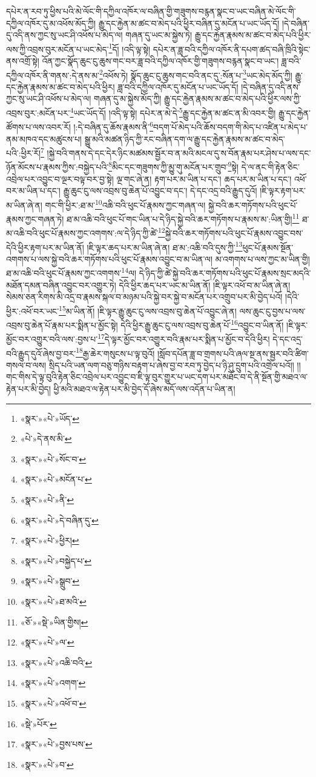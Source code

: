 དཔེར་ན་རབ་ཏུ་ཕྱིས་པའི་མེ་ལོང་གི་དཀྱིལ་འཁོར་ལ་བཞིན་གྱི་གཟུགས་བརྙན་སྣང་བ་ཡང་བཞིན་མེ་ལོང་གི་དཀྱིལ་འཁོར་དུ་མ་འཕོས་མོད་ཀྱི། རྒྱུ་དང་རྐྱེན་མ་ཚང་བ་མེད་པའི་ཕྱིར་བཞིན་དུ་མངོན་པ་ཡང་ཡོད་དོ། །དེ་བཞིན་དུ་འདི་ནས་ཀྱང་སུ་ཡང་ཤི་འཕོས་པ་མེད་ལ། གཞན་དུ་ཡང་མ་སྐྱེས་ཏེ། རྒྱུ་དང་རྐྱེན་རྣམས་མ་ཚང་བ་མེད་པའི་ཕྱིར་ལས་ཀྱི་འབྲས་བུར་མངོན་པ་ཡང་མེད་\footnote{«སྣར་»«པེ་»ཡོད་}དོ། །འདི་ལྟ་སྟེ། དཔེར་ན་ཟླ་བའི་དཀྱིལ་འཁོར་ནི་དཔག་ཚད་བཞི་ཁྲིའི་སྟེང་ནས་འགྲོ་སྟེ། འོན་ཀྱང་སྣོད་ཆུང་ངུ་ཆུས་གང་བར་ཟླ་བའི་དཀྱིལ་འཁོར་གྱི་གཟུགས་བརྙན་སྣང་བ་ཡང་། ཟླ་བའི་དཀྱིལ་འཁོར་ནི་གནས་:དེ་ནས་མ་\footnote{«པེ་»དེ་ནས་མི་}འཕོས་ཏེ། སྣོད་ཆུང་ངུ་ཆུས་གང་བའི་ནང་དུ་:སོན་པ་\footnote{«སྣར་»«པེ་»སོང་བ་}ཡང་མེད་མོད་ཀྱི། རྒྱུ་དང་རྐྱེན་རྣམས་མ་ཚང་བ་མེད་པའི་ཕྱིར། ཟླ་བའི་དཀྱིལ་འཁོར་དུ་མངོན་པ་ཡང་ཡོད་དོ། །དེ་བཞིན་དུ་འདི་ནས་ཀྱང་སུ་ཡང་ཤི་འཕོས་པ་མེད་ལ། གཞན་དུ་མ་སྐྱེས་མོད་ཀྱི། རྒྱུ་དང་རྐྱེན་རྣམས་མ་ཚང་བ་མེད་པའི་ཕྱིར་ལས་ཀྱི་འབྲས་བུར་:མངོན་པར་\footnote{«སྣར་»«པེ་»མངོན་པ་}ཡང་ཡོད་དོ། །འདི་ལྟ་སྟེ། དཔེར་ན་མེ་དེ་\footnote{«སྣར་»«པེ་»ནི་}རྒྱུ་དང་རྐྱེན་མ་ཚང་ན་མི་འབར་གྱི། རྒྱུ་དང་རྐྱེན་ཚོགས་པ་ལས་འབར་རོ། །:དེ་བཞིན་དུ་ཆོས་རྣམས་ནི་\footnote{«སྣར་»«པེ་»དེ་བཞིན་དུ་}བདག་པོ་མེད་པའི་ཆོས་བདག་གི་མེད་པ་འཛིན་པ་མེད་པ་ནམ་མཁའ་དང་མཚུངས་པ། སྒྱུ་མའི་མཚན་ཉིད་ཀྱི་རང་བཞིན་དག་ལ་རྒྱུ་དང་རྐྱེན་རྣམས་མ་ཚང་བ་མེད་པའི་:ཕྱིར་རོ།\footnote{«སྣར་»«པེ་»ཕྱིར།} །སྐྱེ་བའི་གནས་དེ་དང་དེར་ཉིང་མཚམས་སྦྱོར་བ་ན་མའི་མངལ་དུ་ས་བོན་རྣམ་པར་ཤེས་པ་ལས་དང་ཉོན་མོངས་པ་རྣམས་ཀྱིས་:བསྐྱེད་པའི་\footnote{«སྣར་»«པེ་»བསྐྱེད་པ་}མིང་དང་གཟུགས་ཀྱི་མྱུ་གུ་མངོན་པར་གྲུབ་\footnote{«སྣར་»«པེ་»སྒྲུབ་}སྟེ། དེ་ལ་ནང་གི་རྟེན་ཅིང་འབྲེལ་པར་འབྱུང་བ་ལྔར་བལྟ་བར་བྱ་སྟེ། ལྔ་གང་ཞེ་ན། རྟག་པར་མ་ཡིན་པ་དང་། ཆད་པར་མ་ཡིན་པ་དང་། འཕོ་བར་མ་ཡིན་པ་དང་། རྒྱུ་ཆུང་ངུ་ལས་འབྲས་བུ་ཆེན་པོ་འབྱུང་བ་དང་། དེ་དང་འདྲ་བའི་རྒྱུད་དུའོ། །ཇི་ལྟར་རྟག་པར་མ་ཡིན་ཞེ་ན། གང་གི་ཕྱིར་:ཐ་མ་\footnote{«སྣར་»«པེ་»ཐ་མའི་}འཆི་བའི་ཕུང་པོ་རྣམས་ཀྱང་གཞན་ལ། སྐྱེ་བའི་ཆར་གཏོགས་པའི་ཕུང་པོ་རྣམས་ཀྱང་གཞན་ཏེ། ཐ་མ་འཆི་བའི་ཕུང་པོ་གང་ཡིན་པ་དེ་ཉིད་སྐྱེ་བའི་ཆར་གཏོགས་པ་རྣམས་མ་:ཡིན་གྱི།\footnote{«ཅོ་»«སྡེ་»ཡིན་གྱིས།} ཐ་མ་འཆི་བའི་ཕུང་པོ་རྣམས་ཀྱང་འགགས་:ལ་དེ་ཉིད་ཀྱི་ཚེ་\footnote{«སྣར་»«པེ་»ལ་}སྐྱེ་བའི་ཆར་གཏོགས་པའི་ཕུང་པོ་རྣམས་འབྱུང་བས་དེའི་ཕྱིར་རྟག་པར་མ་ཡིན་ནོ། །ཇི་ལྟར་ཆད་པར་མ་ཡིན་ཞེ་ན། ཐ་མ་:འཆི་བའི་དུས་ཀྱི་\footnote{«སྣར་»«པེ་»འཆི་བའི་}ཕུང་པོ་རྣམས་སྔོན་འགགས་པ་ལས་སྐྱེ་བའི་ཆར་གཏོགས་པའི་ཕུང་པོ་རྣམས་འབྱུང་བ་མ་ཡིན་ལ། མ་འགགས་པ་ལས་ཀྱང་མ་ཡིན་གྱི། ཐ་མ་འཆི་བའི་ཕུང་པོ་རྣམས་ཀྱང་འགགས་\footnote{«སྣར་»«པེ་»འགག་}ལ། དེ་ཉིད་ཀྱི་ཚེ་སྐྱེ་བའི་ཆར་གཏོགས་པའི་ཕུང་པོ་རྣམས་སྲང་མདའི་མཐོན་དམན་བཞིན་འབྱུང་བར་འགྱུར་ཏེ། དེའི་ཕྱིར་ཆད་པར་ཡང་མ་ཡིན་ནོ། །ཇི་ལྟར་འཕོ་བ་མ་ཡིན་ཞེ་ན། སེམས་ཅན་རིགས་མི་འདྲ་བ་རྣམས་སྐལ་བ་མཉམ་པའི་སྐྱེ་བར་སྐྱེ་བ་མངོན་པར་འགྲུབ་པར་མི་བྱེད་པའོ། །དེའི་ཕྱིར་:འཕོ་བར་ཡང་\footnote{«སྣར་»«པེ་»འཕོ་བ་}མ་ཡིན་ནོ། །ཇི་ལྟར་རྒྱུ་ཆུང་ངུ་ལས་འབྲས་བུ་ཆེན་པོ་འབྱུང་ཞེ་ན། ལས་ཆུང་ངུ་བྱས་པ་ལས་འབྲས་བུ་ཆེན་པོ་རྣམ་པར་སྨིན་པ་མྱོང་སྟེ། དེའི་ཕྱིར་རྒྱུ་ཆུང་ངུ་ལས་འབྲས་བུ་ཆེན་པོ་\footnote{«སྡེ་»པོར་}འབྱུང་བ་ཡིན་ནོ། །ཇི་ལྟར་མྱོང་བར་འགྱུར་བའི་ལས་:བྱས་པ་\footnote{«སྣར་»«པེ་»བྱས་པས་}དེ་ལྟར་མྱོང་བར་འགྱུར་བའི་རྣམ་པར་སྨིན་པ་མྱོང་བ་དེའི་ཕྱིར། དེ་དང་འདྲ་བའི་རྒྱུད་དུའོ་ཞེས་བྱ་བར་\footnote{«སྣར་»«པེ་»བ་}རྒྱ་ཆེར་གསུངས་པ་ལྟ་བུའོ། །སློབ་དཔོན་ཟླ་བ་གྲགས་པའི་ཞལ་སྔ་ནས་སྦྱར་བའི་ཚིག་གསལ་བ་ལས། སྲིད་པའི་ཡན་ལག་བཅུ་གཉིས་བརྟག་པ་ཞེས་བྱ་བ་རབ་ཏུ་བྱེད་པ་ཉི་ཤུ་དྲུག་པའི་འགྲེལ་པའོ།། །།གང་གིས་དེ་ལྟ་བུའི་རྟེན་ཅིང་འབྲེལ་པར་འབྱུང་བ་ཇི་ལྟ་བུར་གྱུར་པ་ཡང་དག་པར་མཐོང་བ་དེ་ནི་སྔོན་གྱི་མཐའ་ལ་རྟེན་པར་མི་བྱེད། ཕྱི་མའི་མཐའ་ལ་རྟེན་པར་མི་བྱེད་དོ་ཞེས་མདོ་ལས་འདོན་པ་ཡིན་ན། 